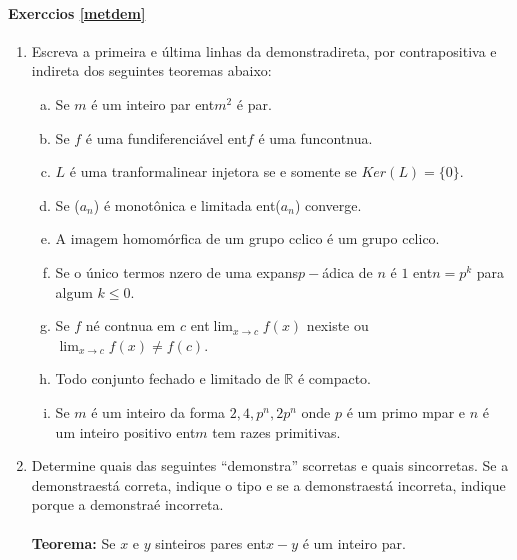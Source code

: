 \paragraph{Exerc\ih cios \ref{metdem}}

\begin{enumerate}[{\bf 1.}]
\item Escreva a primeira e  \'ultima linhas da demonstra\cao direta, por contrapositiva e indireta dos seguintes teoremas abaixo: 
\begin{enumerate}[a)]
\item Se $m$ \'e um inteiro par ent\ao $m^2$ \'e par. 
\item Se $f$ \'e uma fun\cao diferenci\'avel ent\ao $f$ \'e uma fun\cao cont\ih nua.
\item $L$ \'e uma tranforma\cao linear injetora se e somente se $Ker(L)=\{0\}$.
\item Se ($a_n$) \'e monot\^onica e limitada ent\ao ($a_n$) converge.
\item A imagem homom\'orfica de um grupo c\ih clico \'e um grupo c\ih clico.
\item Se o \'unico termos n\ao zero de uma expans\ao $p-$\'adica de $n$ \'e $1$ ent\ao $n=p^k$ para algum $k\leq 0$.
\item Se $f$ n\ao \'e cont\ih nua em $c$ ent\ao $\lim_{x\to c}f(x)$ n\ao existe ou $\lim_{x\to c}f(x)\neq f(c)$. 
\item Todo conjunto fechado e limitado de $\mathbb{R}$ \'e compacto.
\item Se $m$ \'e um inteiro da forma $2,4,p^n,2p^n$ onde $p$ \'e um primo \ih mpar e $n$ \'e um inteiro positivo ent\ao $m$ tem ra\ih zes primitivas.
\end{enumerate}

\item Determine quais das seguintes ``demonstra\cois'' s\ao corretas e quais s\ao incorretas. Se a demonstra\cao est\'a correta, indique o tipo e se a demonstra\cao est\'a incorreta, indique porque a demonstra\cao \'e incorreta.
\\
\\
{\bf Teorema:} Se $x$ e $y$ s\ao inteiros pares ent\ao $x-y$ \'e um inteiro par.


\end{enumerate}
